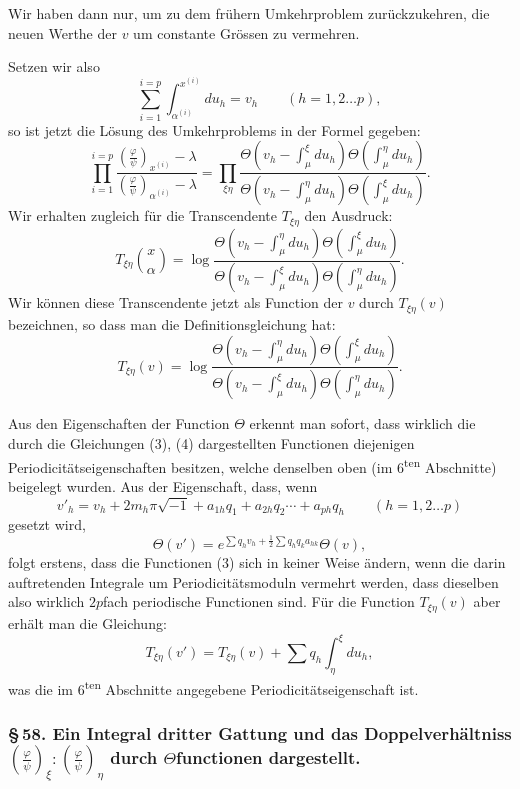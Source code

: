 \documentclass[10pt]{article}
\begin{document}
Wir haben dann nur, um zu dem frühern Umkehrproblem zurückzukehren, die neuen Werthe der \(v\) um constante Grössen zu vermehren.

Setzen wir also
\[
\sum_{i=1}^{i=p}\int_{\alpha^{(i)}}^{x^{(i)}}du_h=v_h\qquad(h=1,2\ldots p),
\]
so ist jetzt die Lösung des Umkehrproblems in der Formel gegeben:
\[
\tag{3}
\prod_{i=1}^{i=p}\frac{\left(\frac{\varphi}{\psi}\right)_{x^{(i)}}-\lambda}
{\left(\frac{\varphi}{\psi}\right)_{\alpha^{(i)}}-\lambda}
=
\prod_{\xi\eta}
\frac{\Theta\!\left(v_h-\int_{\mu}^{\xi}du_h\right)\Theta\!\left(\int_{\mu}^{\eta}du_h\right)}
{\Theta\!\left(v_h-\int_{\mu}^{\eta}du_h\right)\Theta\!\left(\int_{\mu}^{\xi}du_h\right)}.
\]
Wir erhalten zugleich für die Transcendente \(T_{\xi\eta}\) den Ausdruck:
\[
T_{\xi\eta}\binom{x}{\alpha}
=\log
\frac{\Theta\!\left(v_h-\int_{\mu}^{\eta}du_h\right)\Theta\!\left(\int_{\mu}^{\xi}du_h\right)}
{\Theta\!\left(v_h-\int_{\mu}^{\xi}du_h\right)\Theta\!\left(\int_{\mu}^{\eta}du_h\right)}.
\]
Wir können diese Transcendente jetzt als Function der \(v\) durch \(T_{\xi\eta}(v)\) bezeichnen, so dass man die Definitionsgleichung hat:
\[
\tag{4}
T_{\xi\eta}(v)=\log
\frac{\Theta\!\left(v_h-\int_{\mu}^{\eta}du_h\right)\Theta\!\left(\int_{\mu}^{\xi}du_h\right)}
{\Theta\!\left(v_h-\int_{\mu}^{\xi}du_h\right)\Theta\!\left(\int_{\mu}^{\eta}du_h\right)}.
\]

Aus den Eigenschaften der Function \(\Theta\) erkennt man sofort, dass wirklich die durch die Gleichungen (3), (4) dargestellten Functionen diejenigen Periodicitätseigenschaften besitzen, welche denselben oben (im 6\textsuperscript{ten} Abschnitte) beigelegt wurden. Aus der Eigenschaft, dass, wenn
\[
v'_h=v_h+2m_h\pi\sqrt{-1}+a_{1h}q_1+a_{2h}q_2\cdots+a_{ph}q_h
\qquad(h=1,2\ldots p)
\]
gesetzt wird,
\[
\Theta(v')=e^{\sum q_hv_h+\frac12\sum q_hq_ka_{hk}}\Theta(v),
\]
folgt erstens, dass die Functionen (3) sich in keiner Weise ändern, wenn die darin auftretenden Integrale um Periodicitätsmoduln vermehrt werden, dass dieselben also wirklich \(2p\)fach periodische Functionen sind. Für die Function \(T_{\xi\eta}(v)\) aber erhält man die Gleichung:
\[
T_{\xi\eta}(v')=T_{\xi\eta}(v)+\sum q_h\int_{\eta}^{\xi}du_h,
\]
was die im 6\textsuperscript{ten} Abschnitte angegebene Periodicitätseigenschaft ist.

\subsubsection*{\S\,58. Ein Integral dritter Gattung und das Doppelverhältniss \(\left(\frac{\varphi}{\psi}\right)_{\xi}:\left(\frac{\varphi}{\psi}\right)_{\eta}\) durch \(\Theta\)functionen dargestellt.}
\end{document}

